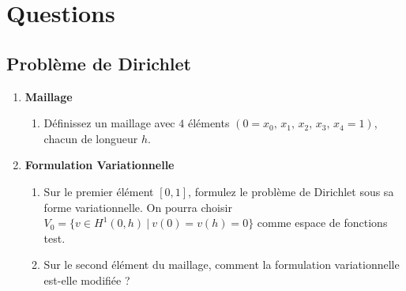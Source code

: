 \documentclass[a4paper,12pt]{article}
\newif\ifcorriges
\newenvironment{solution}
  {
    \ifcorriges
      \begin{framed}
      \par\noindent\textbf{Corrigé :} 
  }
  {
      \end{framed}
    \fi
  }
\begin{document}
\section*{Questions}

\subsection*{Problème de Dirichlet}

\begin{enumerate}

   
    \item \textbf{Maillage}
    \begin{enumerate}
        \item Définissez un maillage avec $4$ éléments $(0=x_0,\,x_1,\,x_2,\,x_3,\,x_4=1)$, chacun de longueur $h$.
        
        \ifcorriges
        \begin{solution}
        
        Divisons l'intervalle \([0,1]\) en 4 éléments égaux. La longueur de chaque élément est \( h = \frac{1}{4} = 0.25 \).

        Les noeuds sont :
        \[
        x_0 = 0, \quad x_1 = h, \quad x_2 = 2h, \quad x_3 = 3h, \quad x_4 = 4h = 1
        \]
        \end{solution}
        \fi
    \end{enumerate}
    
         \item \textbf{Formulation Variationnelle}
    \begin{enumerate}
        \item Sur le premier élément $[0,1]$, formulez le problème de Dirichlet sous sa forme variationnelle. On pourra choisir $V_0 = \{ v \in H^1(0,h) \ | \ v(0) = v(h) = 0 \}$ comme espace de fonctions test.
        
        \ifcorriges
        \begin{solution}

        Nous cherchons \( u \in V \) tel que
        \[
        a(u, v) = L(v) \quad \forall v \in V_0
        \]
        où \( V_0 = \{ v \in H^1(0,h) \ | \ v(0) = v(h) = 0 \} \), et
        \[
        a(u, v) = \int_0^h p \frac{du}{dx} \frac{dv}{dx} \, + \int_0^h q u v 
        \]
        \[
        L(v) = \int_0^h f v
        \]
        \end{solution}
        \fi

        \item Sur le second élément du maillage, comment la formulation variationnelle est-elle modifiée ? 
     \ifcorriges
        \begin{solution}
        Il suffit de changer les bornes d'intégration.
        \end{solution}
        \fi
    \end{enumerate}


\end{enumerate}
\end{document}

